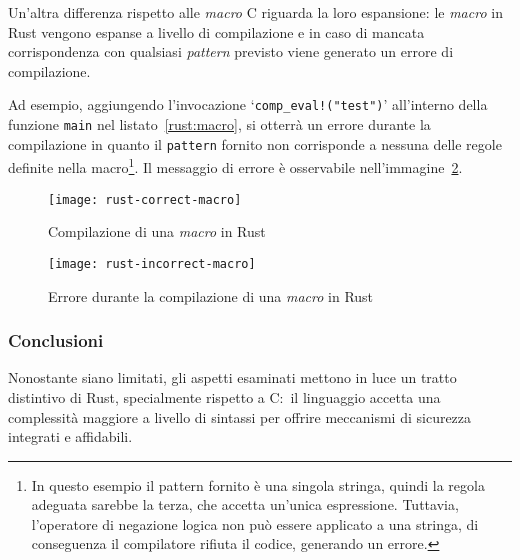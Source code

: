 Un'altra differenza rispetto alle \textit{macro} C riguarda la loro espansione: le \textit{macro} in Rust vengono espanse a livello di compilazione e in caso di mancata
corrispondenza con qualsiasi \textit{pattern} previsto viene generato un errore di compilazione.

Ad esempio, aggiungendo l'invocazione `\texttt{comp\_eval!("test")}' all'interno della funzione \texttt{main} nel listato~\ref{rust:macro}, si otterrà un errore
durante la compilazione in quanto il \texttt{pattern} fornito non corrisponde a nessuna delle regole definite nella macro\footnote{In questo esempio il pattern fornito è una singola stringa, quindi la regola adeguata sarebbe la terza, che accetta un'unica espressione. Tuttavia, l'operatore di negazione logica non può essere applicato a una stringa, di conseguenza il compilatore rifiuta il codice, generando un errore.}.
Il messaggio di errore è osservabile nell'immagine~\ref{rust:incorrect-macro}.
\begin{figure}[htbp]
    \begin{center}
        \texttt{[image: rust-correct-macro]}
        \caption{Compilazione di una \textit{macro} in Rust}\label{rust:correct-macro}
    \end{center}
\end{figure}
\begin{figure}[htbp]
    \begin{center}
        \texttt{[image: rust-incorrect-macro]}
        \caption{Errore durante la compilazione di una \textit{macro} in Rust}\label{rust:incorrect-macro}
    \end{center}
\end{figure}

\subsubsection{Conclusioni}
Nonostante siano limitati, gli aspetti esaminati mettono in luce un tratto distintivo di Rust, specialmente rispetto a C:\ il linguaggio
accetta una complessità maggiore a livello di sintassi per offrire meccanismi di sicurezza integrati e affidabili.